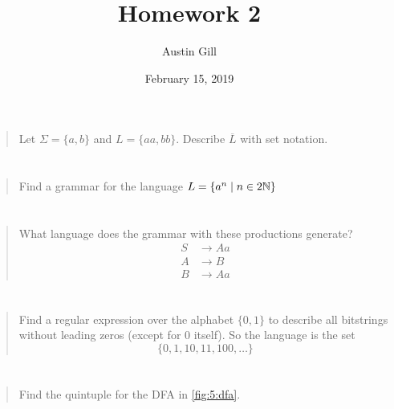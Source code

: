 \documentclass{article}
\title{Homework 2}
\author{Austin Gill}
\date{February 15, 2019}
\begin{document}
\maketitle

\section{}
\begin{quote}
    Let $\Sigma = \{a, b\}$ and $L = \{aa, bb\}$. Describe $\overline L$ with set notation.
\end{quote}

\section{}
\begin{quote}
    Find a grammar for the language $L = \{ a^n \mid n \in 2\mathbb{N} \}$
\end{quote}

\section{}
\begin{quote}
    What language does the grammar with these productions generate?
    \begin{align*}
        S & \to Aa \\
        A & \to B  \\
        B & \to Aa
    \end{align*}
\end{quote}

\section{}
\begin{quote}
    Find a regular expression over the alphabet $\{0, 1\}$ to describe all bitstrings without
    leading zeros (except for 0 itself). So the language is the set
    \[ \{0, 1, 10, 11, 100, \dots \} \]
\end{quote}

\section{}\label{prob:5}
\begin{quote}
    Find the quintuple for the DFA in \autoref{fig:5:dfa}.
\end{quote}
\end{document}
